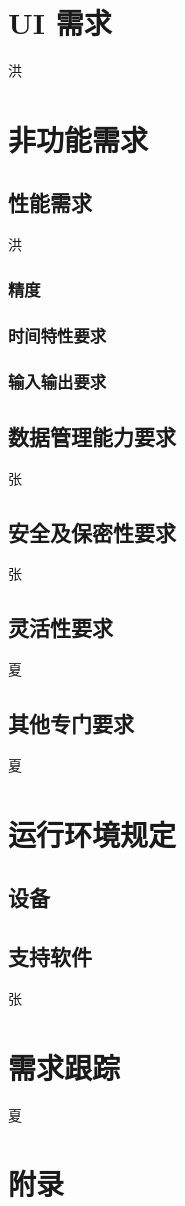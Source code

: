 \documentclass[UTF8]{ctexart}
\begin{document}
\section{UI 需求}
洪

\section{非功能需求}
\subsection{性能需求}
洪
\subsubsection{精度}

\subsubsection{时间特性要求}

\subsubsection{输入输出要求}

\subsection{数据管理能力要求}
张
\subsection{安全及保密性要求}
张
\subsection{灵活性要求}
夏
\subsection{其他专门要求}
夏
\section{运行环境规定}
\subsection{设备}

\subsection{支持软件}
张
\section{需求跟踪}
夏
\section{附录}
\end{document}

